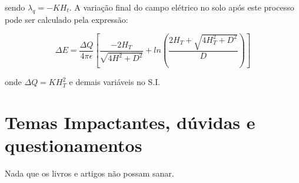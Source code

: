 \documentclass[a4paper, 12pt, onecolumn,singlespacing]{article}
\begin{document}
	sendo $\lambda_q = -KH_t$. A variação final do campo elétrico no solo após este
	processo pode ser calculado pela expressão:
	
	\begin{equation}
		\Delta E = \frac{\Delta Q}{4 \pi \epsilon} \left[\frac{-2 H_T}{\sqrt{4H^2 + D^2}} + ln \left(\frac{2H_T + \sqrt{4H_T^2+ D^2}}{D}\right)\right]
	\end{equation}

	onde $\Delta Q = K H_T^2$ e demais variáveis no S.I.
	
	\section{Temas Impactantes, dúvidas e questionamentos}
	
	Nada que os livros e artigos não possam sanar.
	
\end{document}
